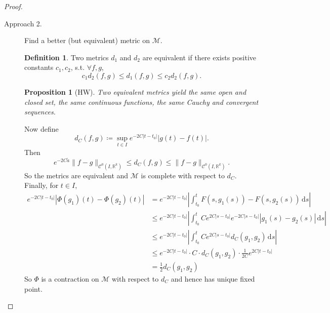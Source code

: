 \documentclass[12pt]{article}
\theoremstyle{plain}
\newtheorem*{prop}{Proposition}
\theoremstyle{definition}
\newtheorem*{defn}{Definition}
\begin{document}
\begin{proof}
\begin{description}
        \item[Approach 2.]
        Find a better (but equivalent) metric on $\mathcal{M}$.
        \begin{defn}
            Two metrics $d_1$ and $d_2$ are equivalent if there exists positive
            constants $c_1,c_2$, s.t. $\forall f,g$,
            $$c_1 d_2(f,g)\leq d_1(f,g)\leq c_2d_2(f,g).$$
        \end{defn}
        \begin{prop}[HW]
            Two equivalent metrics yield the same open and closed set, the same
            continuous functions, the same Cauchy and convergent sequences.
        \end{prop}
        Now define 
        $$d_{C}(f,g)\coloneqq \sup_{t\in I}e^{-2C|t-t_0|}|g(t)-f(t)|.$$
        Then
        $$e^{-2C\tilde{a}}\|f-g\|_{\mathcal{C}^0(I,\mathbb{R}^k)}\leq
        d_C(f,g)\leq
        \|f-g\|_{\mathcal{C}^0(I,\mathbb{R}^k)}.$$
        So the metrics are equivalent and
        $\mathcal{M}$ is complete with respect to $d_C$.
        Finally, for $t\in I$,
        $$\begin{aligned}
            e^{-2C|t-t_0|}\left|\Phi(g_1)(t)-\Phi(g_2)(t)\right|
            &=e^{-2C|t-t_0|}\left |\int_{t_0}^t
            F(s,g_1(s))-F(s,g_2(s))\,\mathrm{d}s\right|\\
            &\leq e^{-2C|t-t_0|}\left|
            \int_{t_0}^t
            Ce^{2C|s-t_0|}e^{-2C|s-t_0|}|g_1(s)-g_2(s)|\,\mathrm{d}s\right|\\
            &\leq e^{-2C|t-t_0|}\left| \int_{t_0}^t
            Ce^{2C|s-t_0|}d_C(g_1,g_2)\,\mathrm{d}s\right|\\
            &\leq e^{-2C|t-t_0|}\cdot C\cdot d_C(g_1,g_2)\cdot\frac{1}{2C}e^{2C|t-t_0|}\\
            &=\frac{1}{2}d_C(g_1,g_2)
        \end{aligned}$$
        So $\Phi$ is a contraction on $\mathcal{M}$ with respect to $d_C$ and
        hence has unique fixed point.
    \end{description}
\end{proof}
\end{document}
